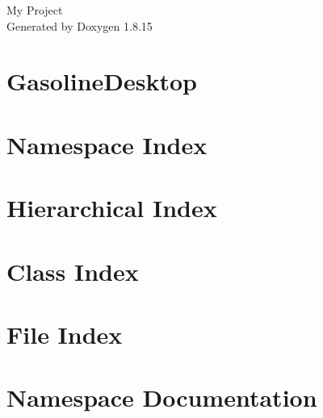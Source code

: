 \let\mypdfximage\pdfximage\def\pdfximage{\immediate\mypdfximage}\documentclass[twoside]{book}
\newcommand{\+}{\discretionary{\mbox{\scriptsize$\hookleftarrow$}}{}{}}
\newcommand{\clearemptydoublepage}{%
  \newpage{\pagestyle{empty}\cleardoublepage}%
}
\begin{document}
\hypersetup{pageanchor=false,
             bookmarksnumbered=true,
             pdfencoding=unicode
            }
\begin{titlepage}
\vspace*{7cm}
\begin{center}%
{\Large My Project }\\
\vspace*{1cm}
{\large Generated by Doxygen 1.8.15}\\
\end{center}
\end{titlepage}
\clearemptydoublepage
{}
\tableofcontents
\clearemptydoublepage
{}
\hypersetup{pageanchor=true}

\chapter{Gasoline\+Desktop}
\label{md__c_1__users_wilcz_source_repos__gasoline_desktop__r_e_a_d_m_e}

\chapter{Namespace Index}

\chapter{Hierarchical Index}

\chapter{Class Index}

\chapter{File Index}

\chapter{Namespace Documentation}



\end{document}
